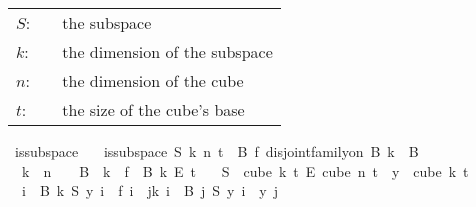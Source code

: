 \begin{isabellebody}
\begin{isamarkuptext}
\begin{tabular}{llp{8cm}}
$S$:& \isa{{\isacharparenleft}{\kern0pt}nat\ {\isasymRightarrow}\ nat{\isacharparenright}{\kern0pt}\ {\isasymRightarrow}\ nat\ {\isasymRightarrow}\ nat}& the subspace\\
$k$:& \isa{nat}& the dimension of the subspace\\
$n$:& \isa{nat}& the dimension of the cube\\
$t$:& \isa{nat}& the size of the cube's base
\end{tabular}%
\end{isamarkuptext}\isamarkuptrue%
\isamarkupfalse%
\ is{\isacharunderscore}{\kern0pt}subspace\isanewline
\ \ \ {\isachardoublequoteopen}is{\isacharunderscore}{\kern0pt}subspace\ S\ k\ n\ t\ {\isasymequiv}\ {\isacharparenleft}{\kern0pt}{\isasymexists}B\ f{\isachardot}{\kern0pt}\ disjoint{\isacharunderscore}{\kern0pt}family{\isacharunderscore}{\kern0pt}on\ B\ {\isacharbraceleft}{\kern0pt}{\isachardot}{\kern0pt}{\isachardot}{\kern0pt}k{\isacharbraceright}{\kern0pt}\ {\isasymand}\ {\isasymUnion}{\isacharparenleft}{\kern0pt}B\ {\isacharbackquote}{\kern0pt}\isanewline
\ \ {\isacharbraceleft}{\kern0pt}{\isachardot}{\kern0pt}{\isachardot}{\kern0pt}k{\isacharbraceright}{\kern0pt}{\isacharparenright}{\kern0pt}\ {\isacharequal}{\kern0pt}\ {\isacharbraceleft}{\kern0pt}{\isachardot}{\kern0pt}{\isachardot}{\kern0pt}{\isacharless}{\kern0pt}n{\isacharbraceright}{\kern0pt}\ {\isasymand}\ {\isacharparenleft}{\kern0pt}{\isacharbraceleft}{\kern0pt}{\isacharbraceright}{\kern0pt}\ {\isasymnotin}\ B\ {\isacharbackquote}{\kern0pt}\ {\isacharbraceleft}{\kern0pt}{\isachardot}{\kern0pt}{\isachardot}{\kern0pt}{\isacharless}{\kern0pt}k{\isacharbraceright}{\kern0pt}{\isacharparenright}{\kern0pt}\ {\isasymand}\ f\ {\isasymin}\ {\isacharparenleft}{\kern0pt}B\ k{\isacharparenright}{\kern0pt}\ {\isasymrightarrow}\isactrlsub E\ {\isacharbraceleft}{\kern0pt}{\isachardot}{\kern0pt}{\isachardot}{\kern0pt}{\isacharless}{\kern0pt}t{\isacharbraceright}{\kern0pt}\isanewline
\ \ {\isasymand}\ S\ {\isasymin}\ {\isacharparenleft}{\kern0pt}cube\ k\ t{\isacharparenright}{\kern0pt}\ {\isasymrightarrow}\isactrlsub E\ {\isacharparenleft}{\kern0pt}cube\ n\ t{\isacharparenright}{\kern0pt}\ {\isasymand}\ {\isacharparenleft}{\kern0pt}{\isasymforall}y\ {\isasymin}\ cube\ k\ t{\isachardot}{\kern0pt}\isanewline
\ \ {\isacharparenleft}{\kern0pt}{\isasymforall}i\ {\isasymin}\ B\ k{\isachardot}{\kern0pt}\ S\ y\ i\ {\isacharequal}{\kern0pt}\ f\ i{\isacharparenright}{\kern0pt}\ {\isasymand}\ {\isacharparenleft}{\kern0pt}{\isasymforall}j{\isacharless}{\kern0pt}k{\isachardot}{\kern0pt}\ {\isasymforall}i\ {\isasymin}\ B\ j{\isachardot}{\kern0pt}\ {\isacharparenleft}{\kern0pt}S\ y{\isacharparenright}{\kern0pt}\ i\ {\isacharequal}{\kern0pt}\ y\ j{\isacharparenright}{\kern0pt}{\isacharparenright}{\kern0pt}{\isacharparenright}{\kern0pt}{\isachardoublequoteclose}%

\end{isabellebody}
